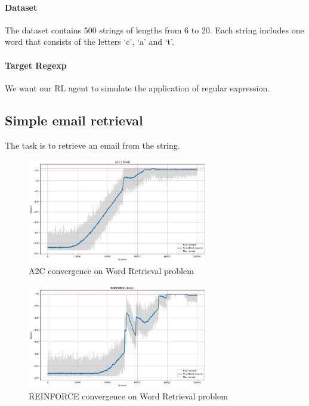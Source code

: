 \documentclass{article}
\begin{document}
\paragraph{Dataset}
The dataset contains 500 strings of lengths from 6 to 20. Each string includes one word that consists of the letters `c', `a' and `t'.

\paragraph{Target Regexp}
We want our RL agent to simulate the application of regular expression.

\subsection{Simple email retrieval}
The task is to retrieve an email from the string. \codeword{[cat]+}

\begin{figure}[H]
  \centering
  \includegraphics[width=0.7\textwidth]{./pictures/a2c_email.jpg}
  \caption[A2C convergence on Email Retrieval problem]
  {A2C convergence on Word Retrieval problem}\label{fig:a2c_email}
\end{figure}

\begin{figure}[H]
  \centering
  \includegraphics[width=0.7\textwidth]{./pictures/reinforce_email.jpg}
  \caption[REINFORCE convergence on Email Retrieval problem]
  {REINFORCE convergence on Word Retrieval problem}\label{fig:reinforce_email}
\end{figure}
\end{document}
